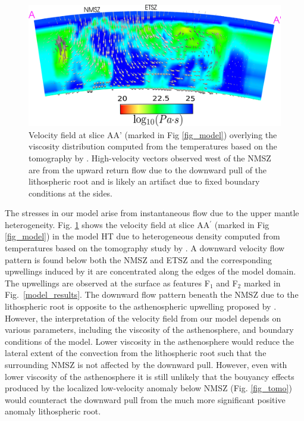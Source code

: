\documentclass[draft,linenumbers]{agujournal2018}
\begin{document}
\begin{figure}[ht]
    \centering
    \includegraphics[width=0.9\linewidth]{figures/velocity_pattern.png}
    \caption{Velocity field at slice AA' (marked in Fig \ref{fig_model}) overlying the viscosity distribution computed from the temperatures based on the tomography by \citet{Biryol_2016}. High-velocity vectors observed west of the NMSZ are from the upward return flow due to the downward pull of the lithospheric root and is likely an artifact due to fixed boundary conditions at the sides.}
    \label{velocity_pattern}
\end{figure}

    The stresses in our model arise from instantaneous flow due to the upper mantle heterogeneity. Fig. \ref{velocity_pattern} shows the velocity field at slice AA$^{\prime}$ (marked in Fig \ref{fig_model}) in the model HT due to heterogeneous density computed from temperatures based on the tomography study by \citet{Biryol_2016}. A downward velocity flow pattern is found below both the NMSZ and ETSZ and the corresponding upwellings induced by it are concentrated along the edges of the model domain. The upwellings are observed at the surface as features F$_1$ and F$_2$ marked in Fig.~\ref{model_results}. The downward flow pattern beneath the NMSZ due to the lithospheric root is opposite to the asthenospheric upwelling proposed by \citet{Biryol_2016}. However, the interpretation of the velocity field from our model depends on various parameters, including the viscosity of the asthenosphere, and boundary conditions of the model. %
    Lower viscosity in the asthenosphere would reduce the lateral extent of the convection from the lithospheric root such that the surrounding NMSZ is not affected by the downward pull. However, even with lower viscosity of the asthenosphere it is still unlikely that the bouyancy effects produced by the localized low-velocity anomaly below NMSZ (Fig. \ref{fig_tomo}) would counteract the downward pull from the much more significant positive anomaly lithospheric root. 
%    
\end{document}
